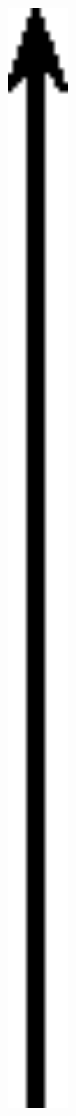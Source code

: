 \begin{enumerate}[noitemsep, label=\textbf{\arabic*}. ]
\begin{enumerate}[noitemsep, label=\textbf{\alph*}. ]
	\begin{figure}[H] %
    \begin{center}
    \label{m38812*id187654!!!underscore!!!media}\label{m38812*id187654!!!underscore!!!printimage}\includegraphics[width=300px]{col11305.imgs/m38812_PG11C1_007.png} %
        

\end{center}
\end{figure}
\end{enumerate}
\end{enumerate}

